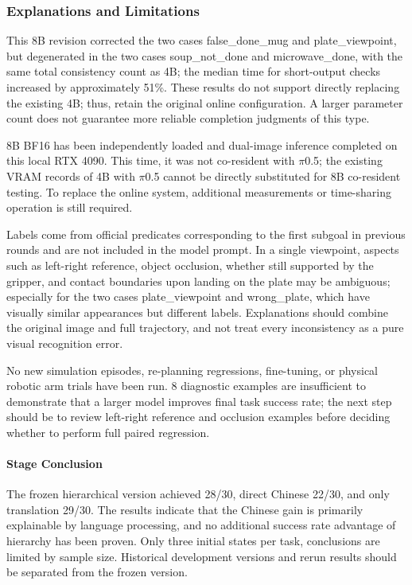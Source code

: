 \subsubsection{Explanations and Limitations}\label{s09-detail-7}

This 8B revision corrected the two cases false\_done\_mug and plate\_viewpoint, but degenerated in the two cases soup\_not\_done and microwave\_done, with the same total consistency count as 4B; the median time for short-output checks increased by approximately 51\%. These results do not support directly replacing the existing 4B; thus, retain the original online configuration. A larger parameter count does not guarantee more reliable completion judgments of this type.

8B BF16 has been independently loaded and dual-image inference completed on this local RTX 4090. This time, it was not co-resident with \(\pi\)0.5; the existing VRAM records of 4B with \(\pi\)0.5 cannot be directly substituted for 8B co-resident testing. To replace the online system, additional measurements or time-sharing operation is still required.

Labels come from official predicates corresponding to the first subgoal in previous rounds and are not included in the model prompt. In a single viewpoint, aspects such as left-right reference, object occlusion, whether still supported by the gripper, and contact boundaries upon landing on the plate may be ambiguous; especially for the two cases plate\_viewpoint and wrong\_plate, which have visually similar appearances but different labels. Explanations should combine the original image and full trajectory, and not treat every inconsistency as a pure visual recognition error.

No new simulation episodes, re-planning regressions, fine-tuning, or physical robotic arm trials have been run. 8 diagnostic examples are insufficient to demonstrate that a larger model improves final task success rate; the next step should be to review left-right reference and occlusion examples before deciding whether to perform full paired regression.



\paragraph{Stage Conclusion} The frozen hierarchical version achieved 28/30, direct Chinese 22/30, and only translation 29/30. The results indicate that the Chinese gain is primarily explainable by language processing, and no additional success rate advantage of hierarchy has been proven. Only three initial states per task, conclusions are limited by sample size. Historical development versions and rerun results should be separated from the frozen version.

